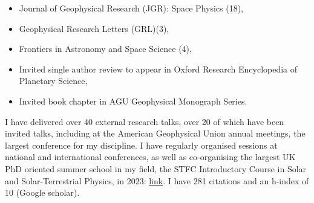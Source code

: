 \documentclass[11pt,a4paper]{article} %
\begin{document}
\begin{itemize}
	\item Journal of Geophysical Research (JGR): Space Physics (18),
		\vspace{-0.25cm}
	\item Geophysical Research Letters (GRL)(3),
		\vspace{-0.25cm}
	\item Frontiers in Astronomy and Space Science (4),   
		\vspace{-0.25cm}
	\item Invited single author review to appear in Oxford Research Encyclopedia of Planetary Science,
		\vspace{-0.25cm}
	\item Invited book chapter in AGU Geophysical Monograph Series.
\end{itemize}

\noindent I have delivered over 40 external research talks, over 20 of which have been invited talks, including at the American Geophysical Union annual meetings, the largest conference for my discipline. I have regularly organised sessions at national and international conferences, as well as co-organising the largest UK PhD oriented summer school in my field, the STFC Introductory Course in Solar and Solar-Terrestrial Physics, in 2023: \href{https://solar-mcs.wp.st-andrews.ac.uk/teaching/stfc-introductory-course-in-solar-and-solar-terrestrial-physics/}{link}. I have 281 citations and an h-index of 10 (Google scholar).




\spacedhrule{0.9em}{-0.4em} %
\end{document}
